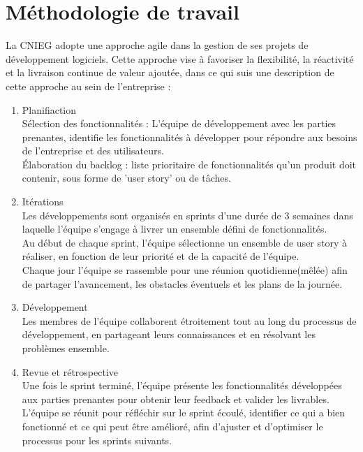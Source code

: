     \section{Méthodologie de travail} 
    La CNIEG adopte une approche agile dans la gestion de ses projets de développement logiciels. Cette approche vise à favoriser la flexibilité, la réactivité et la livraison continue de valeur ajoutée, dans ce qui suis une description de cette approche au sein de l'entreprise :  
    \medskip
    \begin{enumerate}
        \item Planifiaction\\Sélection des fonctionnalités : L’équipe de développement avec les parties prenantes, identifie les fonctionnalités à développer pour répondre aux besoins de l'entreprise et des utilisateurs.\\Élaboration du backlog : liste prioritaire de fonctionnalités qu’un produit doit contenir, sous forme de 'user story' ou de tâches.
        \medskip
        \item Itérations\\Les développements sont organisés en sprints d'une durée de 3 semaines dans laquelle l’équipe s’engage à livrer un ensemble défini de fonctionnalités.\\
        Au début de chaque sprint, l’équipe sélectionne un ensemble de user story à réaliser, en fonction de leur priorité et de la capacité de l’équipe.\\
        Chaque jour l’équipe se rassemble pour une réunion quotidienne(mêlée) afin de partager l’avancement, les obstacles éventuels et les plans de la journée.
        \medskip

        \item Développement\\Les membres de l'équipe collaborent étroitement tout au long du processus de développement, en partageant leurs connaissances et en résolvant les problèmes ensemble.
        \medskip

        \item Revue et rétrospective\\Une fois le sprint terminé, l’équipe présente les fonctionnalités développées aux parties prenantes pour obtenir leur feedback et valider les livrables.\\L’équipe se réunit pour réfléchir sur le sprint écoulé, identifier ce qui a bien fonctionné et ce qui peut être amélioré, afin d’ajuster et d’optimiser le processus pour les sprints suivants.
        \medskip   
    \end{enumerate}
